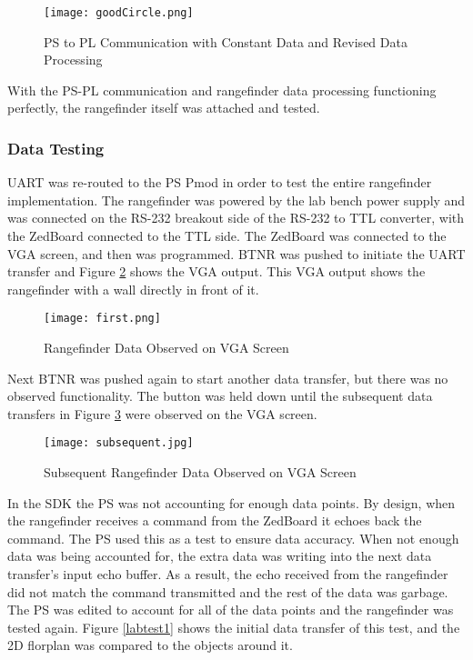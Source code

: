 \begin{figure}[H]
	\centerline{\texttt{[image: goodCircle.png]}}
	\caption{PS to PL Communication with Constant Data and Revised Data Processing}
	\label{goodCircle}
\end{figure}

With the PS-PL communication and rangefinder data processing functioning perfectly, the rangefinder itself was attached and tested.

\subsubsection{Data Testing}
UART was re-routed to the PS Pmod in order to test the entire rangefinder implementation. The rangefinder was powered by the lab bench power supply and was connected on the RS-232 breakout side of the RS-232 to TTL converter, with the ZedBoard connected to the TTL side. The ZedBoard was connected to the VGA screen, and then was programmed. BTNR was pushed to initiate the UART transfer and Figure \ref{first} shows the VGA output. This VGA output shows the rangefinder with a wall directly in front of it.

\begin{figure}[H]
	\centerline{\texttt{[image: first.png]}}
	\caption{Rangefinder Data Observed on VGA Screen}
	\label{first}
\end{figure}

Next BTNR was pushed again to start another data transfer, but there was no observed functionality. The button was held down until the subsequent data transfers in Figure \ref{subsequent} were observed on the VGA screen.

\begin{figure}[H]
	\centerline{\texttt{[image: subsequent.jpg]}}
	\caption{Subsequent Rangefinder Data Observed on VGA Screen}
	\label{subsequent}
\end{figure}

In the SDK the PS was not accounting for enough data points. By design, when the rangefinder receives a command from the ZedBoard it echoes back the command. The PS used this as a test to ensure data accuracy. When not enough data was being accounted for, the extra data was writing into the next data transfer's input echo buffer. As a result, the echo received from the rangefinder did not match the command transmitted and the rest of the data was garbage. The PS was edited to account for all of the data points and the rangefinder was tested again. Figure \ref{labtest1} shows the initial data transfer of this test, and the 2D florplan was compared to the objects around it.

